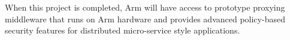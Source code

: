 \documentclass[a4paper]{article}
\begin{document}
When this project is completed, Arm will have access to prototype
proxying middleware that runs on Arm hardware and provides advanced
policy-based security features for distributed micro-service style
applications.








\end{document}

